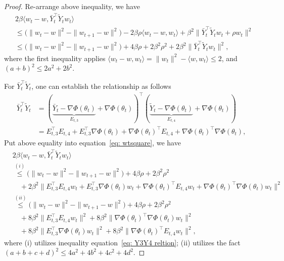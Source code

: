 \documentclass[twoside]{article} %
\def\eqref#1{equation~\ref{#1}}
\theoremstyle{plain}
\theoremstyle{definition}
\theoremstyle{remark}
\newcommand{\Yt}{\tilde{Y}}
\newcommand{\Yb}{\bar{Y}}
\begin{document}
\begin{proof}
Re-arrange above inequality, we have
\begin{align}
    &2\beta \langle {w}_t-{w},\Yb_t^{\top}\Yt_t{w}_t \rangle \nonumber\\
    &\leq \big(\|{w}_t -{w}\|^2-\|{w}_{t+1} -{w} \|^2 \big) -2\beta\rho\langle {w}_t-{w}, {w}_t\rangle + \beta^2 \|\Yb_t^{\top}\Yt_t{w}_t+\rho {w}_t\|^2\nonumber\\
    &{\leq} \big(\|{w}_t -{w}\|^2-\|{w}_{t+1} -{w} \|^2 \big)+4\beta \rho + 2\beta^2\rho^2+ 2\beta^2\|\Yb_t^{\top}\Yt_t{w}_t \|^2,
    \label{eq: wtsquare}
\end{align}
where the first inequality applies $\langle w_t-w,w_t \rangle= \|w_t\|^2-\langle w, w_t\rangle\leq 2$, and $(a+b)^2\leq 2a^2+2b^2$. 

For $\Yb_t^{\top}\Yt_t$, one can establish the relationship as follows
\begin{align}
    \Yb_t^{\top}\Yt_t &=
    (\underbrace{\Yb_t-\nabla\Phi(\theta_t)}_{E_{t,3}}+\nabla \Phi(\theta_t))^{\top}(\underbrace{\Yt_t-\nabla\Phi(\theta_t)}_{E_{t,4}}+\nabla \Phi(\theta_t)) \nonumber \\
    & = E_{t,3}^{\top}E_{t,4} + E_{t,3}^{\top}\nabla\Phi(\theta_t)+\nabla \Phi(\theta_t)^{\top}E_{t,4}+\nabla \Phi(\theta_t)^{\top}\nabla\Phi(\theta_t),
    \label{eq: Y3Y4 reltion}
\end{align}
Put above equality into \eqref{eq: wtsquare}, we have 
\begin{align}
    &2\beta \langle {w}_t-{w},\Yb_t^{\top}\Yt_t{w}_t \rangle \nonumber\\
    & \overset{(i)}{\leq} \big(\|{w}_t -{w}\|^2-\|{w}_{t+1} -{w} \|^2 \big)+4\beta \rho + 2\beta^2\rho^2\nonumber \nonumber\\
    &\quad + 2\beta^2 \|E_{t,3}^{\top}E_{t,4}w_t + E_{t,3}^{\top}\nabla\Phi(\theta_t)w_t+\nabla \Phi(\theta_t)^{\top}E_{t,4}w_t+\nabla \Phi(\theta_t)^{\top}\nabla \Phi(\theta_t)w_t \|^2\nonumber\\
    &\overset{(ii)}{\leq} \big(\|{w}_t -{w}\|^2-\|{w}_{t+1} -{w} \|^2 \big)+4\beta \rho + 2\beta^2\rho^2\nonumber\\
    & \quad+8\beta^2 \|E_{t,3}^{\top}E_{t,4}{w}_t \|^2 + 8\beta^2\|\nabla \Phi(\theta_t)^{\top}\nabla \Phi(\theta_t){w}_t \|^2 \nonumber\\
    &\quad +8\beta^2\|E_{t,3}^{\top}\nabla \Phi(\theta_t){w}_t \|^2+ 8\beta^2\|\nabla \Phi(\theta_t)^{\top}E_{t,4}{w}_t \|^2,
\end{align}
where (i) utilizes inequality \eqref{eq: Y3Y4 reltion}; (ii) utilizes the fact $(a+b+c+d)^2\leq 4a^2+4b^2+4c^2+4d^2$.


\end{proof}
\end{document}
